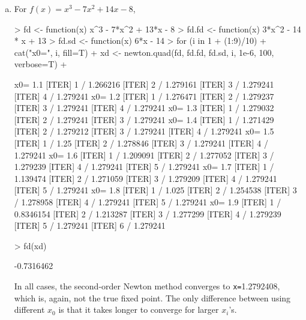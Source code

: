 \documentclass{article}
\begin{document}
\begin{enumerate}[(a)]
    \item For $f(x) = x^3-7x^2+ 14x -8$, 
\begin{Schunk}
\begin{Sinput}
> fd <- function(x) x^3 - 7*x^2 + 13*x - 8
> fd.fd <- function(x) 3*x^2 - 14 * x + 13 
> fd.sd <- function(x) 6*x - 14
> for (i in 1 + (1:9)/10){
+     cat("x0=", i, fill=T)
+     xd <- newton.quad(fd, fd.fd, fd.sd, i, 1e-6, 100, verbose=T)
+ }
\end{Sinput}
\begin{Soutput}
x0= 1.1
[ITER] 1 / 1.266216
[ITER] 2 / 1.279161
[ITER] 3 / 1.279241
[ITER] 4 / 1.279241
x0= 1.2
[ITER] 1 / 1.276471
[ITER] 2 / 1.279237
[ITER] 3 / 1.279241
[ITER] 4 / 1.279241
x0= 1.3
[ITER] 1 / 1.279032
[ITER] 2 / 1.279241
[ITER] 3 / 1.279241
x0= 1.4
[ITER] 1 / 1.271429
[ITER] 2 / 1.279212
[ITER] 3 / 1.279241
[ITER] 4 / 1.279241
x0= 1.5
[ITER] 1 / 1.25
[ITER] 2 / 1.278846
[ITER] 3 / 1.279241
[ITER] 4 / 1.279241
x0= 1.6
[ITER] 1 / 1.209091
[ITER] 2 / 1.277052
[ITER] 3 / 1.279239
[ITER] 4 / 1.279241
[ITER] 5 / 1.279241
x0= 1.7
[ITER] 1 / 1.139474
[ITER] 2 / 1.271059
[ITER] 3 / 1.279209
[ITER] 4 / 1.279241
[ITER] 5 / 1.279241
x0= 1.8
[ITER] 1 / 1.025
[ITER] 2 / 1.254538
[ITER] 3 / 1.278958
[ITER] 4 / 1.279241
[ITER] 5 / 1.279241
x0= 1.9
[ITER] 1 / 0.8346154
[ITER] 2 / 1.213287
[ITER] 3 / 1.277299
[ITER] 4 / 1.279239
[ITER] 5 / 1.279241
[ITER] 6 / 1.279241
\end{Soutput}
\begin{Sinput}
> fd(xd)
\end{Sinput}
\begin{Soutput}
[1] -0.7316462
\end{Soutput}
\end{Schunk}
    In all cases, the second-order Newton method converges to \verb|x=|1.2792408, which is, again, not the true fixed point. The only difference between using different $x_0$ is that it takes longer to converge for larger $x_i$'s. 


\end{enumerate}
\end{document}
